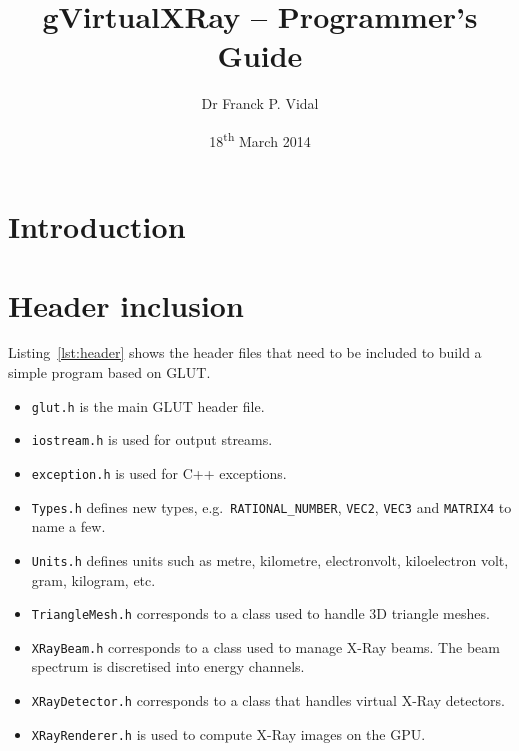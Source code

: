 \documentclass[11pt,oneside,a4paper,final]{article}
\title{gVirtualXRay -- Programmer's Guide}
\author{Dr Franck P. Vidal}
\date{18\textsuperscript{th} March 2014}
\begin{document}
 \sloppy

\maketitle

\newpage
{}
{}
\tableofcontents

\newpage
{}
{}
\listoffigures

\newpage
{}
{}
\listoftables

\newpage
{}
{}
\lstlistoflistings

\newpage

\section{Introduction}

\section{Header inclusion}



Listing~\ref{lst:header} shows the header files that need to be included to build a simple program based on \Gls{GLUT}. 
\begin{itemize}
 \item \verb+glut.h+ is the main \Gls{GLUT} header file.
 \item \verb+iostream.h+ is used for output streams.
 \item \verb+exception.h+ is used for C++ exceptions.
 \item \verb+Types.h+ defines new types, e.g.~\verb+RATIONAL_NUMBER+, \verb+VEC2+, \verb+VEC3+ and \verb+MATRIX4+ to name a few.
 \item \verb+Units.h+ defines units such as metre, kilometre, electronvolt, kiloelectron volt, gram, kilogram, etc.
 \item \verb+TriangleMesh.h+ corresponds to a class used to handle \Acrshort{3D} triangle meshes.
 \item \verb+XRayBeam.h+ corresponds to a class used to manage X-Ray beams. The beam spectrum is discretised into energy channels.
 \item \verb+XRayDetector.h+ corresponds to a class that handles virtual X-Ray detectors.
 \item \verb+XRayRenderer.h+ is used to compute X-Ray images on the \Gls{GPU}.
\end{itemize}
\end{document}
